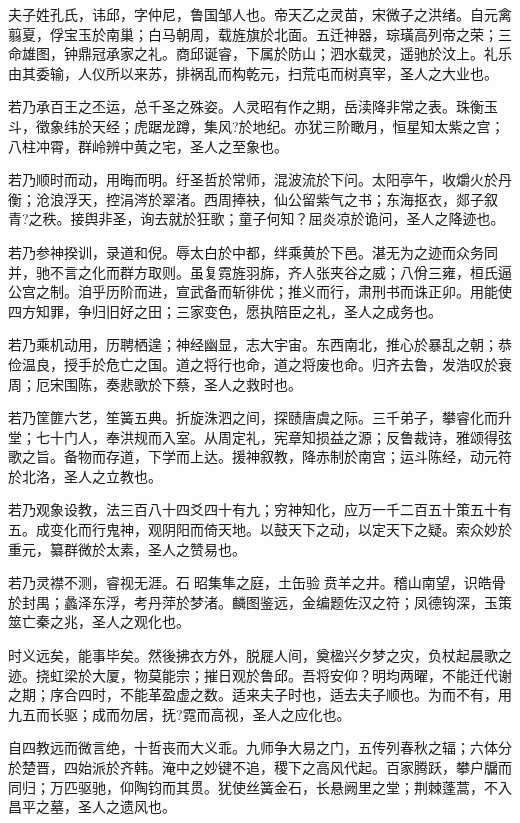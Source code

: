 \documentclass[UTF8,titlepage,oneside]{ctexbook}
\begin{document}
夫子姓孔氏，讳邱，字仲尼，鲁国邹人也。帝天乙之灵苗，宋微子之洪绪。自元禽翦夏，俘宝玉於南巢；白马朝周，载旌旗於北面。五迁神器，琮璜高列帝之荣；三命雄图，钟鼎冠承家之礼。商邱诞睿，下属於防山；泗水载灵，遥驰於汶上。礼乐由其委输，人仪所以来苏，排祸乱而构乾元，扫荒屯而树真宰，圣人之大业也。


若乃承百王之丕运，总千圣之殊姿。人灵昭有作之期，岳渎降非常之表。珠衡玉斗，徵象纬於天经；虎踞龙蹲，集风?於地纪。亦犹三阶瞰月，恒星知太紫之宫；八柱冲霄，群岭辨中黄之宅，圣人之至象也。


若乃顺时而动，用晦而明。纡圣哲於常师，混波流於下问。太阳亭午，收爝火於丹衡；沧浪浮天，控涓涔於翠渚。西周捧袂，仙公留紫气之书；东海抠衣，郯子叙青?之秩。接舆非圣，询去就於狂歌；童子何知？屈炎凉於诡问，圣人之降迹也。


若乃参神揆训，录道和倪。辱太白於中都，绊乘黄於下邑。湛无为之迹而众务同并，驰不言之化而群方取则。虽复霓旌羽旆，齐人张夹谷之威；八佾三雍，桓氏逼公宫之制。洎乎历阶而进，宣武备而斩徘优；推义而行，肃刑书而诛正卯。用能使四方知罪，争归旧好之田；三家变色，愿执陪臣之礼，圣人之成务也。


若乃乘机动用，历聘栖遑；神经幽显，志大宇宙。东西南北，推心於暴乱之朝；恭俭温良，授手於危亡之国。道之将行也命，道之将废也命。归齐去鲁，发浩叹於衰周；厄宋围陈，奏悲歌於下蔡，圣人之救时也。


若乃筐篚六艺，笙簧五典。折旋洙泗之间，探赜唐虞之际。三千弟子，攀睿化而升堂；七十门人，奉洪规而入室。从周定礼，宪章知损益之源；反鲁裁诗，雅颂得弦歌之旨。备物而存道，下学而上达。援神叙教，降赤制於南宫；运斗陈经，动元符於北洛，圣人之立教也。


若乃观象设教，法三百八十四爻四十有九；穷神知化，应万一千二百五十策五十有五。成变化而行鬼神，观阴阳而倚天地。以鼓天下之动，以定天下之疑。索众妙於重元，纂群微於太素，圣人之赞易也。


若乃灵襟不测，睿视无涯。石昭集隼之庭，土缶验贲羊之井。稽山南望，识皓骨於封禺；蠡泽东浮，考丹萍於梦渚。麟图鉴远，金编题佐汉之符；凤德钩深，玉策筮亡秦之兆，圣人之观化也。


时义远矣，能事毕矣。然後拂衣方外，脱屣人间，奠楹兴夕梦之灾，负杖起晨歌之迹。挠虹梁於大厦，物莫能宗；摧日观於鲁邱。吾将安仰？明均两曜，不能迁代谢之期；序合四时，不能革盈虚之数。适来夫子时也，适去夫子顺也。为而不有，用九五而长驱；成而勿居，抚?霓而高视，圣人之应化也。


自四教远而微言绝，十哲丧而大义乖。九师争大易之门，五传列春秋之辐；六体分於楚晋，四始派於齐韩。淹中之妙键不追，稷下之高风代起。百家腾跃，攀户牖而同归；万匹驱驰，仰陶钧而其贯。犹使丝簧金石，长悬阙里之堂；荆棘蓬蒿，不入昌平之墓，圣人之遗风也。
\end{document}
